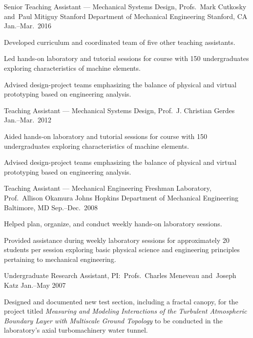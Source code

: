 \begin{cventries}
  \cventry%
    {Senior Teaching Assistant --- Mechanical Systems Design, Profs.~Mark Cutkosky and~Paul Mitiguy}
    {Stanford Department of Mechanical Engineering}
    {Stanford, CA}
    {Jan.--Mar.\ 2016}
    {
      \begin{cvitems}
        \item{Developed curriculum and coordinated team of five other teaching assistants.}
        \item{Led hands-on laboratory and tutorial sessions for course with 150 undergraduates exploring characteristics of machine elements.}
        \item{Advised design-project teams emphasizing the balance of physical and virtual prototyping based on engineering analysis.}
      \end{cvitems}
    }

  \cventry%
    {Teaching Assistant --- Mechanical Systems Design, Prof.~J. Christian Gerdes}
    {}
    {}
    {Jan.--Mar.\ 2012}
    {
      \begin{cvitems}
        \item{Aided hands-on laboratory and tutorial sessions for course with 150 undergraduates exploring characteristics of machine elements.}
        \item{Advised design-project teams emphasizing the balance of physical and virtual prototyping based on engineering analysis.}
      \end{cvitems}
    }

  \cventry%
    {Teaching Assistant --- Mechanical Engineering Freshman Laboratory, Prof.~Allison Okamura}
    {Johns Hopkins Department of Mechanical Engineering}
    {Baltimore, MD}
    {Sep.--Dec.\ 2008}
    {
      \begin{cvitems}
        \item{Helped plan, organize, and conduct weekly hands-on laboratory sessions.}
        \item{Provided assistance during weekly laboratory sessions for approximately 20 students per session exploring basic physical science and engineering principles pertaining to mechanical engineering.}
      \end{cvitems}
    }

 \cventry%
   {Undergraduate Research Assistant, PI:\ Profs.~Charles Meneveau and~Joseph Katz}
   {}
   {}
   {Jan.--May 2007}
   {
     \begin{cvitems}
       \item{Designed and documented new test section, including a fractal canopy, for the project titled \textit{Measuring and Modeling Interactions of the Turbulent Atmospheric Boundary Layer with Multiscale Ground Topology} to be conducted in the laboratory's axial turbomachinery water tunnel.}
     \end{cvitems}
   }


\end{cventries}
